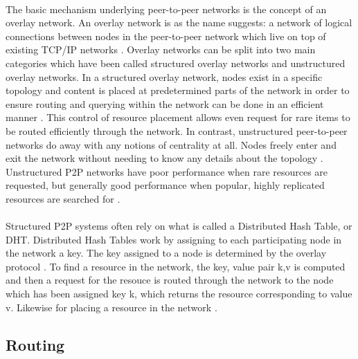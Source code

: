 \documentclass[12pt,letterpaper]{article}
\begin{document}
\paragraph{}

The basic mechanism underlying peer-to-peer networks is the concept of an overlay network.
An overlay network is as the name suggests: a network of logical connections between nodes in the peer-to-peer network which live on top of existing TCP/IP networks \cite{overlay}.
Overlay networks can be split into two main categories which have been called structured overlay networks and unstructured overlay networks.
In a structured overlay network, nodes exist in a specific topology and content is placed at predetermined parts of the network in order to ensure routing and querying within the network can be done in an efficient manner \cite{overlay}.
This control of resource placement allows even request for rare items to be routed efficiently through the network.
In contrast, unstructured peer-to-peer networks do away with any notions of centrality at all.
Nodes freely enter and exit the network without needing to know any details about the topology \cite{overlay}.
Unstructured P2P networks have poor performance when rare resources are requested, but generally good performance when popular, highly replicated resources are searched for \cite{overlay}.

\paragraph{}

Structured P2P systems often rely on what is called a Distributed Hash Table, or DHT. Distributed Hash Tables work by assigning to each participating node in the network a key.
The key assigned to a node is determined by the overlay protocol \cite{overlay}. To find a resource in the network, the key, value pair {k,v} is computed and then a request for the resouce is routed through the network to the node which has been assigned key k, which returns the resource corresponding to value v.
Likewise for placing a resource in the network \cite{overlay}.

\subsection{Routing}

\paragraph{}
\end{document}

